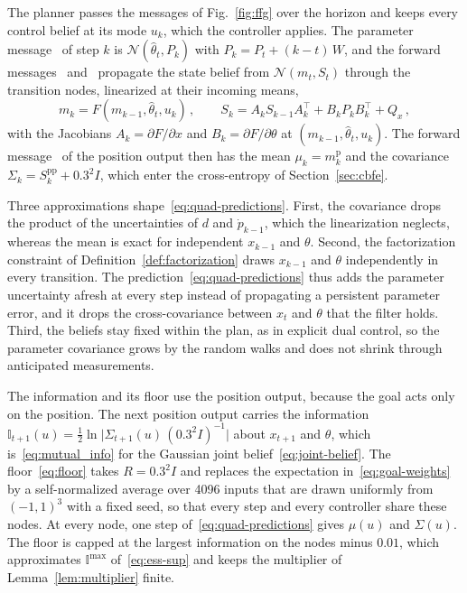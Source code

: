 \documentclass{l4dc2027}
\newcommand*\wcircled[1]{\tikz[baseline=(char.base)]{\node[shape=circle,draw,minimum size=4mm,inner sep=0pt] (char) {#1};}}
\def\cN{\mathcal{N}}
\begin{document}
The planner passes the messages of Fig.~\ref{fig:ffg} over the horizon and keeps every control belief at its mode $u_k$, which the controller applies. The parameter message~\wcircled{4} of step $k$ is $\cN(\hat\theta_t, P_k)$ with $P_k = P_t + (k - t)\, W$, and the forward messages~\wcircled{3} and~\wcircled{5} propagate the state belief from $\cN(m_t, S_t)$ through the transition nodes, linearized at their incoming means,
\begin{equation}\label{eq:quad-predictions}
	m_k = F(m_{k-1}, \hat\theta_t, u_k) \, , \qquad S_k = A_k S_{k-1} A_k^\top + B_k P_k B_k^\top + Q_x \, ,
\end{equation}
with the Jacobians $A_k = \partial F/\partial x$ and $B_k = \partial F/\partial\theta$ at $(m_{k-1}, \hat\theta_t, u_k)$. The forward message~\wcircled{7} of the position output then has the mean $\mu_k = m^{\mathrm{p}}_k$ and the covariance $\Sigma_k = S^{\mathrm{pp}}_k + 0.3^2 I$, which enter the cross-entropy of Section~\ref{sec:cbfe}.

Three approximations shape~\eqref{eq:quad-predictions}. First, the covariance drops the product of the uncertainties of $d$ and $\dot p_{k-1}$, which the linearization neglects, whereas the mean is exact for independent $x_{k-1}$ and $\theta$. Second, the factorization constraint of Definition~\ref{def:factorization} draws $x_{k-1}$ and $\theta$ independently in every transition. The prediction~\eqref{eq:quad-predictions} thus adds the parameter uncertainty afresh at every step instead of propagating a persistent parameter error, and it drops the cross-covariance between $x_t$ and $\theta$ that the filter holds. Third, the beliefs stay fixed within the plan, as in explicit dual control, so the parameter covariance grows by the random walks and does not shrink through anticipated measurements.

The information and its floor use the position output, because the goal acts only on the position. The next position output carries the information $\mathbb{I}_{t+1}(u) = \tfrac{1}{2}\ln\big|\Sigma_{t+1}(u)\,(0.3^2 I)^{-1}\big|$ about $x_{t+1}$ and $\theta$, which is~\eqref{eq:mutual_info} for the Gaussian joint belief~\eqref{eq:joint-belief}. The floor~\eqref{eq:floor} takes $R = 0.3^2 I$ and replaces the expectation in~\eqref{eq:goal-weights} by a self-normalized average over 4096 inputs that are drawn uniformly from $(-1, 1)^3$ with a fixed seed, so that every step and every controller share these nodes. At every node, one step of~\eqref{eq:quad-predictions} gives $\mu(u)$ and $\Sigma(u)$. The floor is capped at the largest information on the nodes minus $0.01$, which approximates $\mathbb{I}^{\max}$ of~\eqref{eq:ess-sup} and keeps the multiplier of Lemma~\ref{lem:multiplier} finite.
\end{document}
